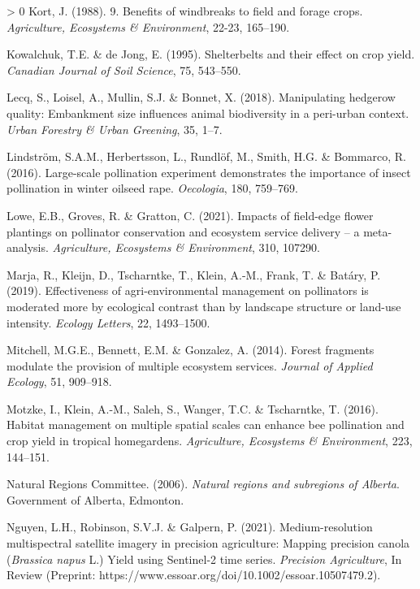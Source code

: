 \documentclass[]{elsarticle} %
\newlength{\cslhangindent}
\newenvironment{CSLReferences}[3] %
 {%
  \setlength{\parindent}{0pt}
  \ifodd #1 \everypar{\setlength{\hangindent}{\cslhangindent}}\ignorespaces\fi
  \ifnum #2 > 0
  \setlength{\parskip}{#2\baselineskip}
  \fi
 }%
 {}
\begin{document}
\begin{CSLReferences}{1}{0}
\leavevmode\hypertarget{ref-kort1988}{}%
Kort, J. (1988). 9. Benefits of windbreaks to field and forage crops. \emph{Agriculture, Ecosystems {\&} Environment}, 22-23, 165--190.

\leavevmode\hypertarget{ref-kowalchuk1995}{}%
Kowalchuk, T.E. \& de Jong, E. (1995). Shelterbelts and their effect on crop yield. \emph{Canadian Journal of Soil Science}, 75, 543--550.

\leavevmode\hypertarget{ref-lecq2018}{}%
Lecq, S., Loisel, A., Mullin, S.J. \& Bonnet, X. (2018). Manipulating hedgerow quality: Embankment size influences animal biodiversity in a peri-urban context. \emph{Urban Forestry {\&} Urban Greening}, 35, 1--7.

\leavevmode\hypertarget{ref-lindstrom2016}{}%
Lindström, S.A.M., Herbertsson, L., Rundlöf, M., Smith, H.G. \& Bommarco, R. (2016). Large-scale pollination experiment demonstrates the importance of insect pollination in winter oilseed rape. \emph{Oecologia}, 180, 759--769.

\leavevmode\hypertarget{ref-lowe2021}{}%
Lowe, E.B., Groves, R. \& Gratton, C. (2021). Impacts of field-edge flower plantings on pollinator conservation and ecosystem service delivery -- a meta-analysis. \emph{Agriculture, Ecosystems {\&} Environment}, 310, 107290.

\leavevmode\hypertarget{ref-marja2019}{}%
Marja, R., Kleijn, D., Tscharntke, T., Klein, A.-M., Frank, T. \& Batáry, P. (2019). Effectiveness of agri-environmental management on pollinators is moderated more by ecological contrast than by landscape structure or land-use intensity. \emph{Ecology Letters}, 22, 1493--1500.

\leavevmode\hypertarget{ref-mitchell2014}{}%
Mitchell, M.G.E., Bennett, E.M. \& Gonzalez, A. (2014). Forest fragments modulate the provision of multiple ecosystem services. \emph{Journal of Applied Ecology}, 51, 909--918.

\leavevmode\hypertarget{ref-motzke2016}{}%
Motzke, I., Klein, A.-M., Saleh, S., Wanger, T.C. \& Tscharntke, T. (2016). Habitat management on multiple spatial scales can enhance bee pollination and crop yield in tropical homegardens. \emph{Agriculture, Ecosystems \& Environment}, 223, 144--151.

\leavevmode\hypertarget{ref-ABRegions2006}{}%
Natural Regions Committee. (2006). \emph{Natural regions and subregions of {Alberta}}. Government of Alberta, Edmonton.

\leavevmode\hypertarget{ref-nguyen2021}{}%
Nguyen, L.H., Robinson, S.V.J. \& Galpern, P. (2021). Medium-resolution multispectral satellite imagery in precision agriculture: Mapping precision canola ({\emph{Brassica napus}} {L.}) Yield using {Sentinel-2} time series. \emph{Precision Agriculture}, In Review (Preprint: https://www.essoar.org/doi/10.1002/essoar.10507479.2).


\end{CSLReferences}
\end{document}
